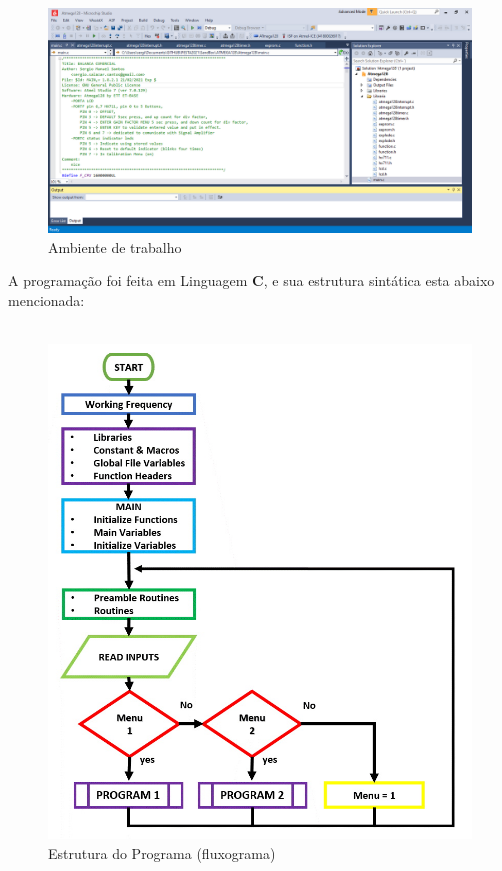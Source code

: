 \begin{figure}[H]
	\centering
	\includegraphics[width=\linewidth]{./image/PESTA/IDE/Work-Space.png}
	\caption{Ambiente de trabalho}
	\label{Work-Space}
\end{figure}
\newpage
 A programação foi feita em Linguagem \textbf{C}, e sua estrutura sintática esta abaixo mencionada:
\\
\\
\begin{figure}[H]
	\centering
	\includegraphics[scale=0.6]{./image/PESTA/flowchart/Main_Program_1.jpg}
	\caption{Estrutura do Programa (fluxograma)}
	\label{Main_Program_1}
\end{figure}
